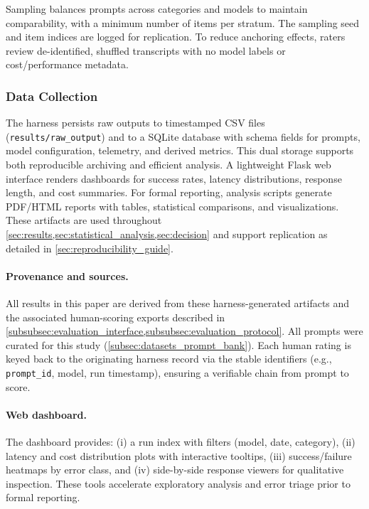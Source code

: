 Sampling balances prompts across categories and models to maintain comparability, with a minimum number of items per stratum. The sampling seed and item indices are logged for replication. To reduce anchoring effects, raters review de-identified, shuffled transcripts with no model labels or cost/performance metadata.

\subsubsection{Data Collection}
\label{subsubsec:data_collection}

The harness persists raw outputs to timestamped CSV files (\verb|results/raw_output|) and to a SQLite database with schema fields for prompts, model configuration, telemetry, and derived metrics. This dual storage supports both reproducible archiving and efficient analysis. A lightweight Flask web interface renders dashboards for success rates, latency distributions, response length, and cost summaries. For formal reporting, analysis scripts generate PDF/HTML reports with tables, statistical comparisons, and visualizations. These artifacts are used throughout \cref{sec:results,sec:statistical_analysis,sec:decision} and support replication as detailed in \cref{sec:reproducibility_guide}.

\paragraph{Provenance and sources.} All results in this paper are derived from these harness-generated artifacts and the associated human-scoring exports described in \cref{subsubsec:evaluation_interface,subsubsec:evaluation_protocol}. All prompts were curated for this study (\cref{subsec:datasets_prompt_bank}). Each human rating is keyed back to the originating harness record via the stable identifiers (e.g., \verb|prompt_id|, model, run timestamp), ensuring a verifiable chain from prompt to score.

\paragraph{Web dashboard.} The dashboard provides: (i) a run index with filters (model, date, category), (ii) latency and cost distribution plots with interactive tooltips, (iii) success/failure heatmaps by error class, and (iv) side-by-side response viewers for qualitative inspection. These tools accelerate exploratory analysis and error triage prior to formal reporting.


